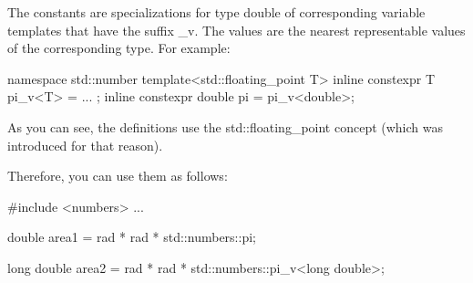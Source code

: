 The constants are specializations for type double of corresponding variable templates that have the suffix \_v. The values are the nearest representable values of the corresponding type. For example:

\begin{cpp}
namespace std::number {
	template<std::floating_point T> inline constexpr T pi_v<T> = ... ;
	inline constexpr double pi = pi_v<double>;
}
\end{cpp}

As you can see, the definitions use the std::floating\_point concept (which was introduced for that reason).

Therefore, you can use them as follows:

\begin{cpp}
#include <numbers>
...

double area1 = rad * rad * std::numbers::pi;

long double area2 = rad * rad * std::numbers::pi_v<long double>;
\end{cpp}






















